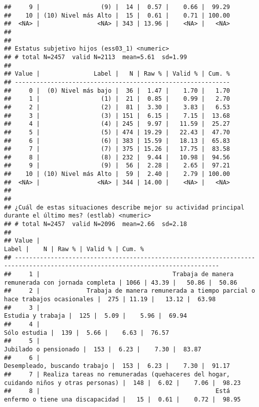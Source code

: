 \documentclass[
  10,
  landscape,
  legalpaper]{article}
\begin{document}
\begin{verbatim}
##     9 |                 (9) |  14 |  0.57 |    0.66 |  99.29
##    10 | (10) Nivel más Alto |  15 |  0.61 |    0.71 | 100.00
##  <NA> |                <NA> | 343 | 13.96 |    <NA> |   <NA>
## 
## 
## Estatus subjetivo hijos (ess03_1) <numeric>
## # total N=2457  valid N=2113  mean=5.61  sd=1.99
## 
## Value |               Label |   N | Raw % | Valid % | Cum. %
## ------------------------------------------------------------
##     0 |  (0) Nivel más bajo |  36 |  1.47 |    1.70 |   1.70
##     1 |                 (1) |  21 |  0.85 |    0.99 |   2.70
##     2 |                 (2) |  81 |  3.30 |    3.83 |   6.53
##     3 |                 (3) | 151 |  6.15 |    7.15 |  13.68
##     4 |                 (4) | 245 |  9.97 |   11.59 |  25.27
##     5 |                 (5) | 474 | 19.29 |   22.43 |  47.70
##     6 |                 (6) | 383 | 15.59 |   18.13 |  65.83
##     7 |                 (7) | 375 | 15.26 |   17.75 |  83.58
##     8 |                 (8) | 232 |  9.44 |   10.98 |  94.56
##     9 |                 (9) |  56 |  2.28 |    2.65 |  97.21
##    10 | (10) Nivel más Alto |  59 |  2.40 |    2.79 | 100.00
##  <NA> |                <NA> | 344 | 14.00 |    <NA> |   <NA>
## 
## 
## ¿Cuál de estas situaciones describe mejor su actividad principal durante el último mes? (estlab) <numeric>
## # total N=2457  valid N=2096  mean=2.66  sd=2.18
## 
## Value |                                                                                 Label |    N | Raw % | Valid % | Cum. %
## -------------------------------------------------------------------------------------------------------------------------------
##     1 |                                     Trabaja de manera remunerada con jornada completa | 1066 | 43.39 |   50.86 |  50.86
##     2 |             Trabaja de manera remunerada a tiempo parcial o hace trabajos ocasionales |  275 | 11.19 |   13.12 |  63.98
##     3 |                                                                     Estudia y trabaja |  125 |  5.09 |    5.96 |  69.94
##     4 |                                                                          Sólo estudia |  139 |  5.66 |    6.63 |  76.57
##     5 |                                                                 Jubilado o pensionado |  153 |  6.23 |    7.30 |  83.87
##     6 |                                                         Desempleado, buscando trabajo |  153 |  6.23 |    7.30 |  91.17
##     7 | Realiza tareas no remuneradas (quehaceres del hogar, cuidando niños y otras personas) |  148 |  6.02 |    7.06 |  98.23
##     8 |                                                 Está enfermo o tiene una discapacidad |   15 |  0.61 |    0.72 |  98.95

\end{verbatim}
\end{document}
